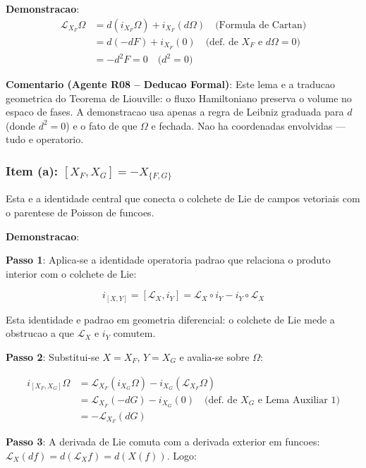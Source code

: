 \documentclass[5p]{elsarticle}
\begin{document}
\textbf{Demonstracao}:
\begin{align}
\mathcal{L}_{X_F}\Omega &= d(i_{X_F}\Omega) + i_{X_F}(d\Omega)
  \quad\text{(Formula de Cartan)} \nonumber\\
&= d(-dF) + i_{X_F}(0) \quad\text{(def. de $X_F$ e $d\Omega = 0$)} \nonumber\\
&= -d^2F = 0 \quad\text{($d^2 = 0$)} \nonumber
\end{align}

\textbf{Comentario (Agente R08 -- Deducao Formal)}: Este lema e a
traducao geometrica do Teorema de Liouville: o fluxo Hamiltoniano
preserva o volume no espaco de fases. A demonstracao usa apenas a
regra de Leibniz graduada para $d$ (donde $d^2 = 0$) e o fato de que
$\Omega$ e fechada. Nao ha coordenadas envolvidas --- tudo e operatorio.

\subsubsection*{Item (a): $[X_F, X_G] = -X_{\{F,G\}}$}

Esta e a identidade central que conecta o colchete de Lie de campos
vetoriais com o parentese de Poisson de funcoes.

\textbf{Demonstracao}:

\textbf{Passo 1}: Aplica-se a identidade operatoria padrao que
relaciona o produto interior com o colchete de Lie:

\begin{equation}
i_{[X,Y]} = [\mathcal{L}_X, i_Y] = \mathcal{L}_X \circ i_Y - i_Y \circ \mathcal{L}_X
\label{eq:lieinterior}
\end{equation}

Esta identidade e padrao em geometria diferencial: o colchete de Lie
mede a obstrucao a que $\mathcal{L}_X$ e $i_Y$ comutem.

\textbf{Passo 2}: Substitui-se $X = X_F$, $Y = X_G$ e avalia-se
sobre $\Omega$:

\begin{align}
i_{[X_F, X_G]}\Omega &= \mathcal{L}_{X_F}(i_{X_G}\Omega) - i_{X_G}(\mathcal{L}_{X_F}\Omega) \nonumber\\
&= \mathcal{L}_{X_F}(-dG) - i_{X_G}(0) \quad\text{(def. de $X_G$ e Lema Auxiliar 1)} \nonumber\\
&= -\mathcal{L}_{X_F}(dG) \nonumber
\end{align}

\textbf{Passo 3}: A derivada de Lie comuta com a derivada exterior em
funcoes: $\mathcal{L}_X(df) = d(\mathcal{L}_X f) = d(X(f))$. Logo:
\end{document}
